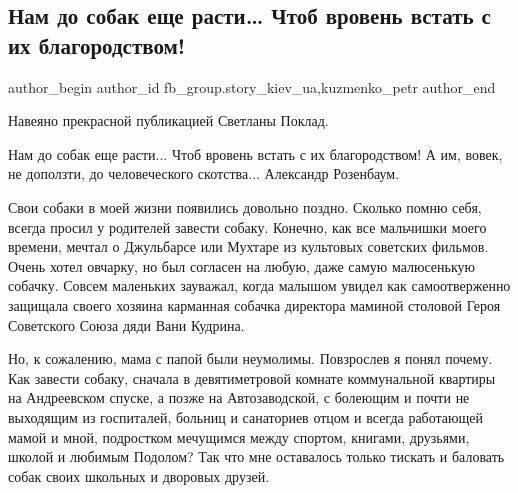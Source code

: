  
 
 
 
 
 
\subsection{Нам до собак еще расти… Чтоб вровень встать с их благородством!}
\label{sec:17_03_2021.fb.fb_group.story_kiev_ua.1.sobaki}
 
\ifcmt
 author_begin
   author_id fb_group.story_kiev_ua,kuzmenko_petr
 author_end
\fi

Навеяно прекрасной публикацией Светланы Поклад. 

\begin{zznagolos}
\obeycr
Нам до собак еще расти... Чтоб вровень встать с их благородством!
А им, вовек, не доползти, до человеческого скотства...
\smallskip
Александр Розенбаум.
\restorecr
\end{zznagolos}

Свои собаки в моей жизни появились довольно поздно. Сколько помню себя, всегда
просил у родителей завести собаку. Конечно, как все мальчишки моего времени,
мечтал о Джульбарсе или Мухтаре из культовых советских фильмов. Очень хотел
овчарку, но был согласен на любую, даже самую малюсенькую собачку. Совсем
маленьких зауважал, когда малышом увидел как самоотверженно защищала своего
хозяина карманная собачка директора маминой столовой Героя Советского Союза
дяди Вани Кудрина. 

Но, к сожалению, мама с папой были неумолимы. Повзрослев я понял почему. Как
завести собаку, сначала в девятиметровой комнате коммунальной квартиры на
Андреевском спуске, а позже на Автозаводской, с болеющим и почти не выходящим
из госпиталей, больниц и санаториев отцом и всегда работающей мамой и мной,
подростком мечущимся между спортом, книгами, друзьями, школой и любимым
Подолом? Так что мне оставалось только тискать и баловать собак своих школьных
и дворовых друзей. 

